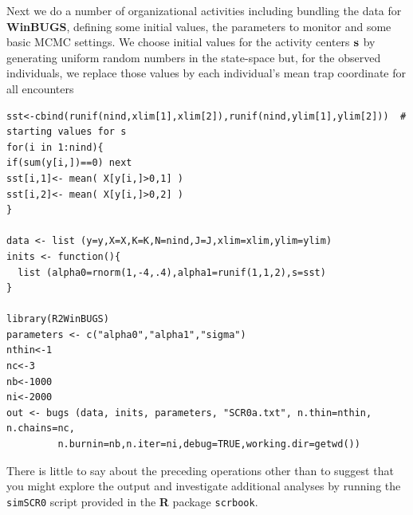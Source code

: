 Next we do a number of organizational activities including bundling
the data for {\bf WinBUGS}, defining some initial values, the parameters to
monitor and some basic MCMC settings.  We choose initial values for
the activity centers ${\bf s}$ by generating uniform random numbers in
the state-space but, for the observed individuals, we replace those
values by each individual's mean trap coordinate for all encounters
{\small
\begin{verbatim}
sst<-cbind(runif(nind,xlim[1],xlim[2]),runif(nind,ylim[1],ylim[2]))  # starting values for s
for(i in 1:nind){
if(sum(y[i,])==0) next
sst[i,1]<- mean( X[y[i,]>0,1] )
sst[i,2]<- mean( X[y[i,]>0,2] )
}

data <- list (y=y,X=X,K=K,N=nind,J=J,xlim=xlim,ylim=ylim)
inits <- function(){
  list (alpha0=rnorm(1,-4,.4),alpha1=runif(1,1,2),s=sst)
}

library(R2WinBUGS)
parameters <- c("alpha0","alpha1","sigma")
nthin<-1
nc<-3
nb<-1000
ni<-2000
out <- bugs (data, inits, parameters, "SCR0a.txt", n.thin=nthin, n.chains=nc,
         n.burnin=nb,n.iter=ni,debug=TRUE,working.dir=getwd())
\end{verbatim}
}
There is little to say about the preceding operations other than to
suggest that you might explore the output and investigate additional
analyses by running the \mbox{\tt simSCR0} script provided in the
{\bf R} package \mbox{\tt scrbook}.

